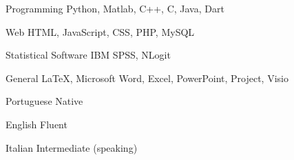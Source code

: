 

\begin{cvskills}

  \cvskill
    {Programming} %
    {Python, Matlab, C++, C, Java, Dart} %

  \cvskill
    {Web} %
    {HTML, JavaScript, CSS, PHP, MySQL} %
    
  \cvskill
    {Statistical Software} %
    {IBM SPSS, NLogit} %
 
  \cvskill
    {General} %
    {\LaTeX, Microsoft Word, Excel, PowerPoint, Project, Visio} %
    
\end{cvskills}


\begin{cvskills}

  \cvskill
    {Portuguese} %
    {Native} %

  \cvskill
    {English} %
    {Fluent} %
    
  \cvskill
    {Italian} %
    {Intermediate (speaking)} %
    
\end{cvskills}